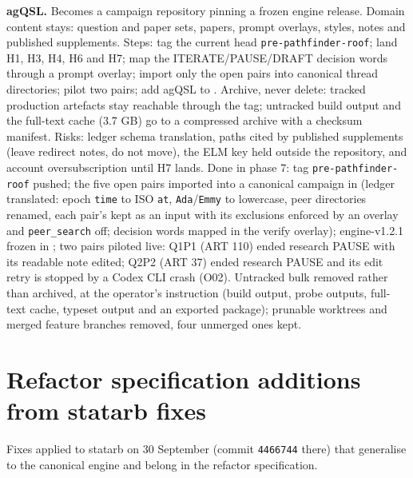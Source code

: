 \documentclass[11pt,a4paper]{article}
\begin{document}
\textbf{agQSL.} Becomes a campaign repository pinning a frozen engine release.
Domain content stays: question and paper sets, papers, prompt overlays, styles,
notes and published supplements. Steps: tag the current head
\texttt{pre-pathfinder-roof}; land H1, H3, H4, H6 and H7; map the
ITERATE/PAUSE/DRAFT decision words through a prompt overlay; import only the open
pairs into canonical thread directories; pilot two pairs; add agQSL to
. Archive, never delete: tracked production artefacts stay
reachable through the tag; untracked build output and the full-text cache (3.7 GB)
go to a compressed archive with a checksum manifest. Risks: ledger schema
translation, paths cited by published supplements (leave redirect notes, do not
move), the ELM key held outside the repository, and account oversubscription
until H7 lands.
Done in phase 7: tag \texttt{pre-pathfinder-roof} pushed; the five open pairs
imported into a canonical campaign in  (ledger translated: epoch
\texttt{time} to ISO \texttt{at}, \texttt{Ada}/\texttt{Emmy} to lowercase, peer
directories renamed, each pair's  kept as an input with its
exclusions enforced by an overlay and \texttt{peer\_search} off; decision words
mapped in the verify overlay); engine-v1.2.1 frozen in ; two
pairs piloted live: Q1P1 (ART 110) ended research PAUSE with its readable note edited; Q2P2 (ART 37) ended research PAUSE and its edit retry is stopped by a Codex CLI crash (O02). Untracked bulk removed rather than archived, at the
operator's instruction (build output, probe outputs, full-text cache, typeset
output and an exported package); prunable worktrees and merged feature branches
removed, four unmerged ones kept.

\section{Refactor specification additions from statarb fixes}\label{sec:spec-additions}

Fixes applied to statarb on 30 September (commit \texttt{4466744} there) that
generalise to the canonical engine and belong in the refactor specification.
\end{document}

